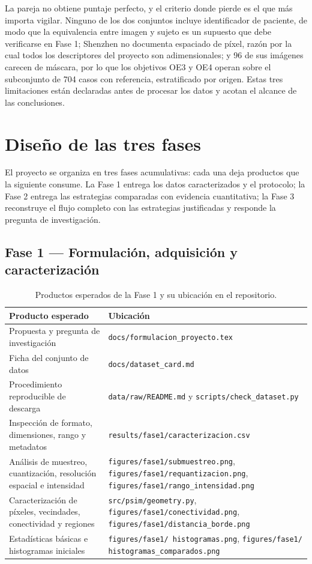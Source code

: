 \documentclass[12pt,a4paper]{article}
\begin{document}
La pareja no obtiene puntaje perfecto, y el criterio donde pierde es el que más
importa vigilar. Ninguno de los dos conjuntos incluye identificador de paciente, de
modo que la equivalencia entre imagen y sujeto es un supuesto que debe verificarse
en Fase 1; Shenzhen no documenta espaciado de píxel, razón por la cual todos los
descriptores del proyecto son adimensionales; y 96 de sus imágenes carecen de
máscara, por lo que los objetivos OE3 y OE4 operan sobre el subconjunto de 704
casos con referencia, estratificado por origen. Estas tres limitaciones están
declaradas antes de procesar los datos y acotan el alcance de las conclusiones.



\section{Diseño de las tres fases}

El proyecto se organiza en tres fases acumulativas: cada una deja productos que la
siguiente consume. La Fase 1 entrega los datos caracterizados y el protocolo; la
Fase 2 entrega las estrategias comparadas con evidencia cuantitativa; la Fase 3
reconstruye el flujo completo con las estrategias justificadas y responde la
pregunta de investigación.

\subsection{Fase 1 — Formulación, adquisición y caracterización}

\begin{table}[H]
\centering
\caption{Productos esperados de la Fase 1 y su ubicación en el repositorio.}
\small
\footnotesize
\begin{tabular}{@{}p{5.6cm}p{7.9cm}@{}}
\toprule
\textbf{Producto esperado} & \textbf{Ubicación} \\
\midrule
Propuesta y pregunta de investigación & \texttt{docs/formulacion\_proyecto.tex} \\
Ficha del conjunto de datos & \texttt{docs/dataset\_card.md} \\
Procedimiento reproducible de descarga & \texttt{data/raw/README.md} y \texttt{scripts/check\_dataset.py} \\
Inspección de formato, dimensiones, rango y metadatos & \texttt{results/fase1/caracterizacion.csv} \\
Análisis de muestreo, cuantización, resolución espacial e intensidad & \texttt{figures/fase1/submuestreo.png}, \texttt{figures/fase1/requantizacion.png}, \texttt{figures/fase1/rango\_intensidad.png} \\
Caracterización de píxeles, vecindades, conectividad y regiones & \texttt{src/psim/geometry.py}, \texttt{figures/fase1/conectividad.png}, \texttt{figures/fase1/distancia\_borde.png} \\
Estadísticas básicas e histogramas iniciales & \texttt{figures/fase1/ histogramas.png}, \texttt{figures/fase1/ histogramas\_comparados.png} \\
\bottomrule
\end{tabular}
\end{table}
\end{document}
